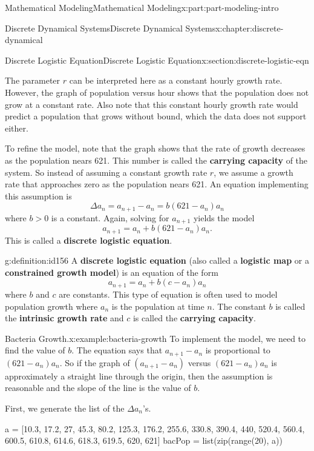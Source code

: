 \documentclass[oneside,10pt,]{book}
\newcommand{\terminology}[1]{\textbf{#1}}
\numberwithin{equation}{section}
\newcommand{\gt}{>}
\begin{document}
\begin{partptx}{Mathematical Modeling}{}{Mathematical Modeling}{}{}{x:part:part-modeling-intro}
\begin{chapterptx}{Discrete Dynamical Systems}{}{Discrete Dynamical Systems}{}{}{x:chapter:discrete-dynamical}
\begin{sectionptx}{Discrete Logistic Equation}{}{Discrete Logistic Equation}{}{}{x:section:discrete-logistic-eqn}
\begin{introduction}{}
\begin{equation*}
\end{equation*}
The parameter \(r\) can be interpreted here as a constant hourly growth rate.  However, the graph of population versus hour shows that the population does not grow at a constant rate. Also note that this constant hourly growth rate would predict a population that grows without bound, which the data does not support either.%
\par
To refine the model, note that the graph shows that the rate of growth decreases as the population nears 621.  This number is called the \terminology{carrying capacity} of the system.  So instead of assuming a constant growth rate \(r\), we assume a growth rate that approaches zero as the population nears 621. An equation implementing this assumption is%
%
\begin{equation*}
\Delta a_n = a_{n+1} - a_n = b(621-a_n)a_n
\end{equation*}
where \(b\gt 0\) is a constant.  Again, solving for \(a_{n+1}\) yields the model%
%
\begin{equation*}
a_{n+1} = a_n + b(621-a_n)a_n.
\end{equation*}
This is called a \terminology{discrete logistic equation}.%
\begin{definition}{}{g:definition:id156}%
A \terminology{discrete logistic equation} (also called a \terminology{logistic map} or a \terminology{constrained growth model}) is an equation of the form%
%
\begin{equation*}
a_{n+1} = a_n + b(c-a_n)a_n
\end{equation*}
where \(b\) and \(c\) are constants. This type of equation is often used to model population growth where \(a_n\) is the population at time \(n\). The constant \(b\) is called the \terminology{intrinsic growth rate} and \(c\) is called the \terminology{carrying capacity}.%
\end{definition}
\end{introduction}%
\begin{example}{Bacteria Growth.}{x:example:bacteria-growth}%
To implement the model, we need to find the value of \(b\).  The equation says that \(a_{n+1} - a_n\) is proportional to \((621-a_n)a_n\).  So if the graph of \((a_{n+1}-a_n)\) versus \((621-a_n)a_n\) is approximately a straight line through the origin, then the assumption is reasonable and the slope of the line is the value of \(b\).%
\par
First, we generate the list of the \(\Delta a_n\)'s.%
\begin{sageinput}
a = [10.3, 17.2, 27, 45.3, 80.2, 125.3, 176.2, 255.6, 330.8,
390.4, 440, 520.4, 560.4, 600.5, 610.8, 614.6, 618.3,
619.5, 620, 621]
bacPop = list(zip(range(20), a))


\end{sageinput}
\end{example}
\end{sectionptx}
\end{chapterptx}
\end{partptx}
\end{document}

